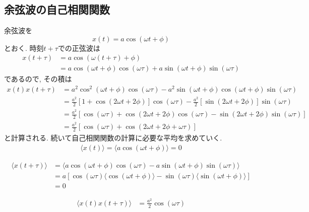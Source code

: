 \subsection{余弦波の自己相関関数}
余弦波を
\begin{equation}
    x(t) = a \cos(\omega t + \phi)
\end{equation}
とおく.
時刻$t+\tau$での正弦波は
\begin{align}
    x(t+\tau)
    &= a \cos(\omega (t + \tau) + \phi) \\
    &= a \cos(\omega t + \phi) \cos(\omega \tau)
     + a \sin(\omega t + \phi) \sin(\omega \tau)
\end{align}
であるので, その積は
\begin{align}
    x(t) x(t + \tau)
    &=
    a^{2} \cos^{2}(\omega t + \phi) \cos(\omega \tau) -
    a^{2} \sin(\omega t + \phi) \cos(\omega t + \phi) \sin(\omega \tau) \\
    &=
    \frac{a^{2}}{2} [1 + \cos(2\omega t + 2\phi)] \cos(\omega \tau) -
    \frac{a^{2}}{2} [\sin(2\omega t + 2\phi)] \sin(\omega \tau) \\
    &=
    \frac{a^{2}}{2}
    [ \cos(\omega \tau)
    + \cos(2\omega t + 2\phi)\cos(\omega \tau)
    - \sin(2\omega t + 2\phi)\sin(\omega \tau)] \\
    &=
    \frac{a^{2}}{2}
    [\cos(\omega \tau) + \cos (2\omega t + 2\phi + \omega \tau)]
\end{align}
と計算される.
続いて自己相関関数の計算に必要な平均を求めていく.
\begin{align}
    \langle x(t) \rangle = \langle a \cos(\omega t + \phi) \rangle = 0
\end{align}

\begin{align}
    \langle x(t+\tau) \rangle
    &=
    \langle
        a \cos(\omega t + \phi) \cos(\omega \tau) -
        a \sin(\omega t + \phi) \sin(\omega \tau)
    \rangle \\
    &=
    a [\cos(\omega \tau) \langle \cos(\omega t + \phi) \rangle -
       \sin(\omega \tau) \langle \sin(\omega t + \phi) \rangle ]\\
    &=
    0
\end{align}

\begin{align}
    \langle x(t) x(t+\tau) \rangle
    &=
    \frac{a^{2}}{2} \cos(\omega \tau)
\end{align}

